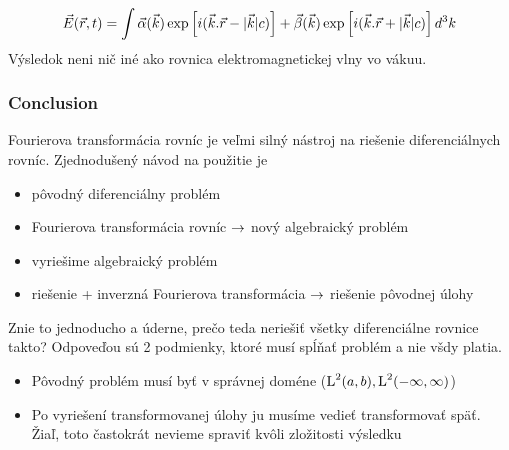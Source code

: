 \begin{equation}
 \vec{E}{(\vec{r},t)} = \int \vec{\alpha}(\vec{k}) \exp \left[i(
 \vec{k}.\vec{r} - |\vec{k}| c) \right] +
 \vec{\beta}(\vec{k}) \exp \left[i(
 \vec{k}.\vec{r} + |\vec{k}| c)\right] d^3k
\end{equation}
Výsledok neni nič iné ako rovnica elektromagnetickej vlny vo vákuu.

\subsubsection{Conclusion}
Fourierova transformácia rovníc je veľmi silný nástroj na riešenie
diferenciálnych rovníc. Zjednodušený návod na použitie je 
\begin{itemize}
\item pôvodný diferenciálny problém
\item Fourierova transformácia rovníc $\rightarrow$ nový algebraický
problém
\item vyriešime algebraický problém
\item riešenie + inverzná Fourierova transformácia $\rightarrow$ riešenie
pôvodnej úlohy
\end{itemize}

Znie to jednoducho a úderne, prečo teda neriešiť všetky diferenciálne
rovnice takto? Odpoveďou sú 2 podmienky, ktoré musí spĺňať problém a
nie všdy platia.
\begin{itemize}
\item Pôvodný problém musí byť v správnej doméne ($\mbox{L}^2(a,b),\mbox{L}^2(-\infty,\infty)$)
\item Po vyriešení transformovanej úlohy ju musíme vedieť
transformovať späť. Žiaľ, toto častokrát nevieme spraviť kvôli
zložitosti výsledku
\end{itemize}
